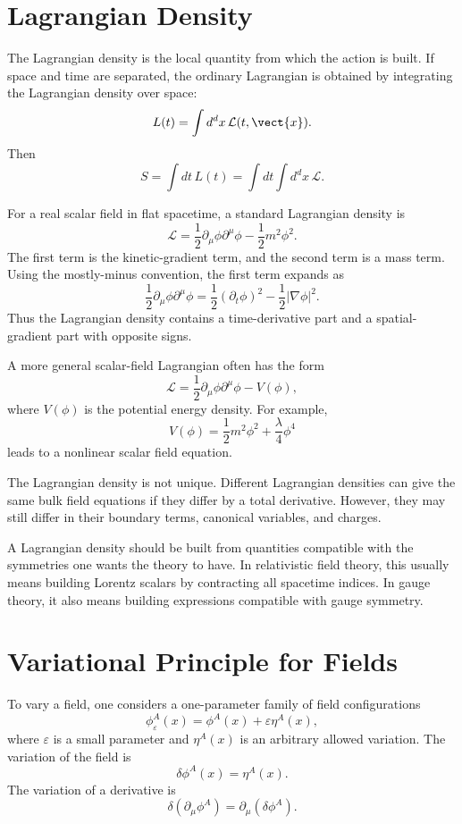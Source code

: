 \section{Lagrangian Density}

The Lagrangian density is the local quantity from which the action is built. If
space and time are separated, the ordinary Lagrangian is obtained by integrating
the Lagrangian density over space:
\[
    L(t)=\int d^d x\,\mathcal{L}(t,\vect{x}).
\]
Then
\[
    S=\int dt\,L(t)=\int dt\int d^d x\,\mathcal{L}.
\]

For a real scalar field in flat spacetime, a standard Lagrangian density is
\[
    \mathcal{L}=\frac{1}{2}\partial_\mu\phi\partial^\mu\phi
    -\frac{1}{2}m^2\phi^2.
\]
The first term is the kinetic-gradient term, and the second term is a mass term.
Using the mostly-minus convention, the first term expands as
\[
    \frac{1}{2}\partial_\mu\phi\partial^\mu\phi
    =\frac{1}{2}(\partial_t\phi)^2-\frac{1}{2}|\nabla\phi|^2.
\]
Thus the Lagrangian density contains a time-derivative part and a spatial-gradient
part with opposite signs.

A more general scalar-field Lagrangian often has the form
\[
    \mathcal{L}=\frac{1}{2}\partial_\mu\phi\partial^\mu\phi - V(\phi),
\]
where \(V(\phi)\) is the potential energy density. For example,
\[
    V(\phi)=\frac{1}{2}m^2\phi^2+\frac{\lambda}{4}\phi^4
\]
leads to a nonlinear scalar field equation.

\begin{remarkbox}
The Lagrangian density is not unique. Different Lagrangian densities can give
the same bulk field equations if they differ by a total derivative. However,
they may still differ in their boundary terms, canonical variables, and charges.
\end{remarkbox}

A Lagrangian density should be built from quantities compatible with the
symmetries one wants the theory to have. In relativistic field theory, this
usually means building Lorentz scalars by contracting all spacetime indices. In
gauge theory, it also means building expressions compatible with gauge symmetry.

\section{Variational Principle for Fields}

To vary a field, one considers a one-parameter family of field configurations
\[
    \phi^A_\varepsilon(x)=\phi^A(x)+\varepsilon\eta^A(x),
\]
where \(\varepsilon\) is a small parameter and \(\eta^A(x)\) is an arbitrary
allowed variation. The variation of the field is
\[
    \delta\phi^A(x)=\eta^A(x).
\]
The variation of a derivative is
\[
    \delta(\partial_\mu\phi^A)=\partial_\mu(\delta\phi^A).
\]

